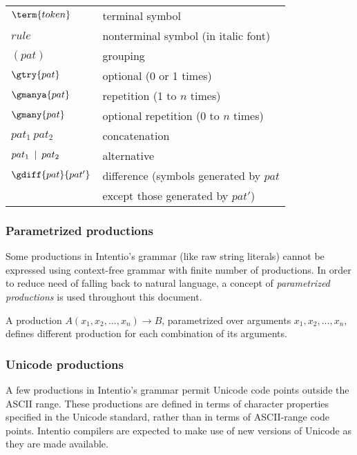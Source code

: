 \begin{bnfutils}
\begin{center}
\begin{tabular}[t]{ll}
  \(\term{token}\)        & terminal symbol \\
  \(rule\)                & nonterminal symbol (in italic font) \\
  \((pat)\)               & grouping \\
  \(\gtry{pat}\)          & optional (0 or 1 times) \\
  \(\gmanya{pat}\)        & repetition (1 to \(n\) times) \\
  \(\gmany{pat}\)         & optional repetition (0 to \(n\) times) \\
  \(pat_1 \ pat_2\)       & concatenation \\
  \(pat_1 \hskip0.5em\relax | \hskip0.5em\relax pat_2\)    & alternative \\
  \(\gdiff{pat}{pat'}\)   & difference (symbols generated by \(pat\) \\
                          & except those generated by \(pat'\))
\end{tabular}
\end{center}
\end{bnfutils}

\subsubsection*{Parametrized productions}

Some productions in Intentio's grammar (like raw string literals) cannot be expressed using context-free grammar with finite number of productions. In order to reduce need of falling back to natural language, a concept of \emph{parametrized productions} is used throughout this document.

A production \(A(x_1, x_2, ..., x_n) \rightarrow B\), parametrized over arguments \(x_1, x_2, ..., x_n\), defines different production for each combination of its arguments.

\subsubsection*{Unicode productions}

A few productions in Intentio's grammar permit Unicode\cite{Unicode} code points outside the ASCII range. These productions are defined in terms of character properties specified in the Unicode standard, rather than in terms of ASCII-range code points. Intentio compilers are expected to make use of new versions of Unicode as they are made available.

